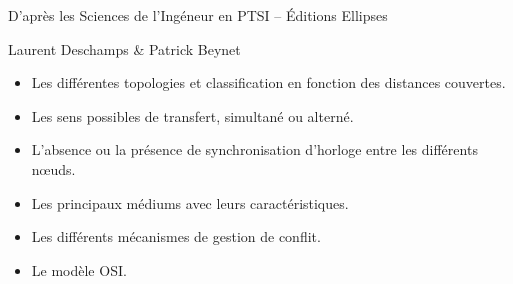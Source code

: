 \documentclass[10pt]{article}
\begin{document}


%
%
%
%
%

\begin{center}
D'après les Sciences de l'Ingéneur en PTSI -- Éditions Ellipses

Laurent Deschamps \& Patrick Beynet
\end{center}

\begin{obj}
\begin{itemize}
\item Les différentes topologies et classification en fonction des distances couvertes.
\item Les sens possibles de transfert, simultané ou alterné.
\item L’absence ou la présence de synchronisation d’horloge entre les différents nœuds.
\item Les principaux médiums avec leurs caractéristiques.
\item Les différents mécanismes de gestion de conflit.
\item Le modèle OSI.
\end{itemize}
\end{obj}
\end{document}
